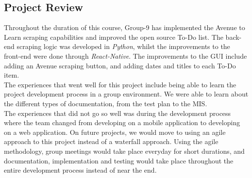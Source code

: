 \documentclass[11pt, oneside]{article}   	%
\begin{document}
\subsection*{Project Review}
\color{red}

Throughout the duration of this course, Group-9 has implemented the Avenue to Learn scraping capabilities and improved the open source To-Do list. The back-end scraping logic was developed in {\it Python}, whilst the improvements to the front-end were done through {\it React-Native}. The improvements to the GUI include adding an Avenue scraping button, and adding dates and titles to each To-Do item.\\

The experiences that went well for this project include being able to learn the project development process in a group environment. We were able to learn about the different types of documentation, from the test plan to the MIS.\\

The experiences that did not go so well was during the development process where the team changed from developing on a mobile application to developing on a web application. On future projects, we would move to using an agile approach to this project instead of a waterfall approach. Using the agile methodology, group meetings would take place everyday for short durations, and documentation, implementation and testing would take place throughout the entire development process instead of near the end.
\end{document}
